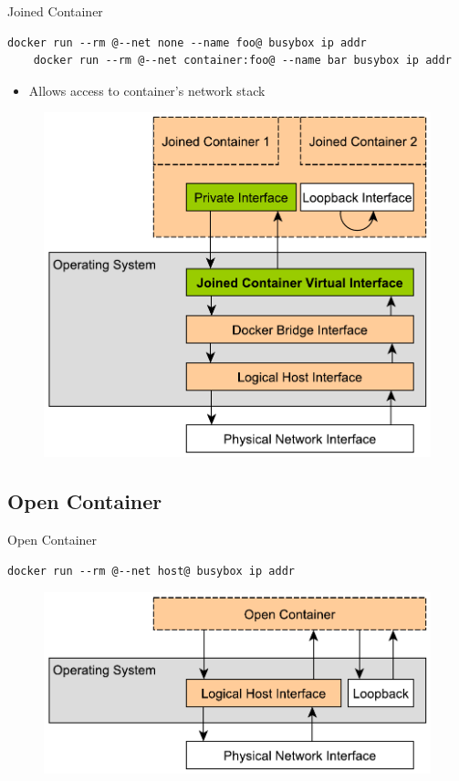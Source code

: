 \begin{frame}[fragile]{Joined Container}
  \begin{lstlisting}[basicstyle=\ttfamily\tiny\color{myblue},frame=single]
    docker run --rm @--net none --name foo@ busybox ip addr
    docker run --rm @--net container:foo@ --name bar busybox ip addr
  \end{lstlisting}
  \begin{itemize}
    \item Allows access to container's network stack
  \end{itemize} 
  \begin{figure}
    \includegraphics[scale=0.4]{figures/net-joined-containers.pdf}
  \end{figure}
\end{frame}

\subsection{Open Container}

\begin{frame}[fragile]{Open Container}
  \begin{lstlisting}[basicstyle=\ttfamily\tiny\color{myblue},frame=single]
    docker run --rm @--net host@ busybox ip addr
  \end{lstlisting}
  \begin{figure}
    \includegraphics[scale=0.5]{figures/net-open-container.pdf}
  \end{figure}
\end{frame}

